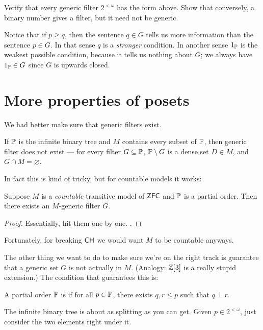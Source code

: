 \begin{exercise}
	Verify that every generic filter $2^{<\omega}$ has the form above.
	Show that conversely, a binary number gives a filter, but it need not be generic.
\end{exercise}

Notice that if $p \ge q$, then the sentence $q \in G$ tells us more information than the sentence $p \in G$.
In that sense $q$ is a \emph{stronger} condition.
In another sense $1_\mathbb P$ is the weakest possible condition,
because it tells us nothing about $G$; we always have $1_\mathbb P \in G$
since $G$ is upwards closed.

\section{More properties of posets}
We had better make sure that generic filters exist.
\begin{example}
	If $\mathbb P$ is the infinite binary tree and $M$ contains every subset of $\mathbb P$, then generic filter
	does not exist --- for every filter $G \subseteq \mathbb P$, $\mathbb P \setminus G$ is a dense set $D \in
	M$, and $G \cap M = \varnothing$.
\end{example}
In fact this is kind of tricky, but for countable models it works:
\begin{lemma}
	Suppose $M$ is a \emph{countable} transitive model of $\mathsf{ZFC}$
	and $\mathbb P$ is a partial order.
	Then there exists an $M$-generic filter $G$.
\end{lemma}
\begin{proof}
	Essentially, hit them one by one.
	.
\end{proof}

Fortunately, for breaking $\mathsf{CH}$ we would want $M$ to be countable anyways.

The other thing we want to do to make sure we're on the right track is guarantee
that a generic set $G$ is not actually in $M$.
(Analogy: $\mathbb Z[3]$ is a really stupid extension.)
The condition that guarantees this is:

\begin{definition}
	A partial order $\mathbb P$ is  if
	for all $p \in \mathbb P$, there exists $q,r \le p$
	such that $q \perp r$.
\end{definition}
\begin{example}
	The infinite binary tree is about as splitting as you can get.
	Given $p \in 2^{<\omega}$, just consider the two elements right under it.
\end{example}

